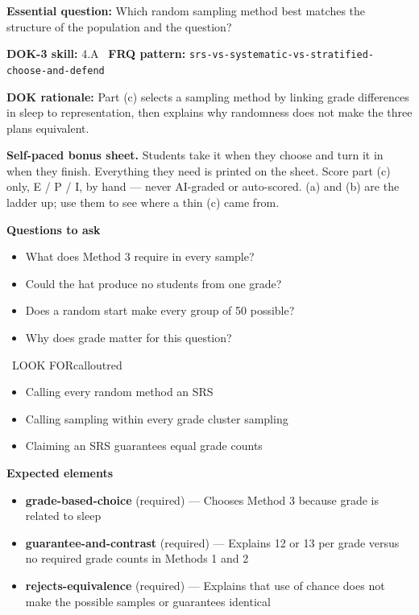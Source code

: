 \documentclass[11pt]{article}
\begin{document}
\textbf{Essential question:} Which random sampling method best matches the structure of the population and the question?\par
\textbf{DOK-3 skill:} 4.A \textperiodcentered\ \textbf{FRQ pattern:} {\small\texttt{srs-\allowbreak{}vs-\allowbreak{}systematic-\allowbreak{}vs-\allowbreak{}stratified-\allowbreak{}choose-\allowbreak{}and-\allowbreak{}defend}}\par
\textbf{DOK rationale:} Part (c) selects a sampling method by linking grade differences in sleep to representation, then explains why randomness does not make the three plans equivalent.\par

\textbf{Self-paced bonus sheet.} Students take it when they choose and turn it in when they finish. Everything they need is printed on the sheet. Score part (c) only, E / P / I, by hand --- never AI-graded or auto-scored. (a) and (b) are the ladder up; use them to see where a thin (c) came from.\par

\textbf{Questions to ask}
\begin{itemize}[leftmargin=1.5em,itemsep=2pt,topsep=2pt]
  \item What does Method 3 require in every sample?
  \item Could the hat produce no students from one grade?
  \item Does a random start make every group of 50 possible?
  \item Why does grade matter for this question?
\end{itemize}

\begin{callout}{\IconWarn\ LOOK FOR}{calloutred}
\begin{itemize}[leftmargin=1.5em,itemsep=2pt,topsep=2pt]
  \item Calling every random method an SRS
  \item Calling sampling within every grade cluster sampling
  \item Claiming an SRS guarantees equal grade counts
\end{itemize}
\end{callout}


\textbf{Expected elements}
\begin{itemize}[leftmargin=1.5em,itemsep=2pt,topsep=2pt]
  \item \textbf{grade-based-choice} (required) --- Chooses Method 3 because grade is related to sleep
  \item \textbf{guarantee-and-contrast} (required) --- Explains 12 or 13 per grade versus no required grade counts in Methods 1 and 2
  \item \textbf{rejects-equivalence} (required) --- Explains that use of chance does not make the possible samples or guarantees identical
\end{itemize}
\end{document}
